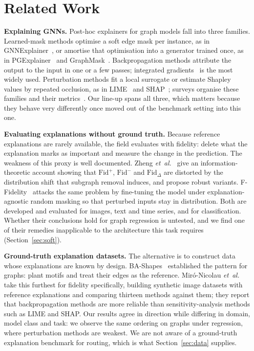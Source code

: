 \documentclass[conference]{IEEEtran}
\begin{document}
\section{Related Work}
\label{sec:related}
\textbf{Explaining GNNs.} Post-hoc explainers for graph models fall into three
families. Learned-mask methods optimise a soft edge mask per instance, as in
GNNExplainer~\cite{ying2019gnnexplainer}, or amortise that optimisation into a
generator trained once, as in PGExplainer~\cite{luo2020pgexplainer} and
GraphMask~\cite{schlichtkrull2021graphmask}. Backpropagation methods attribute
the output to the input in one or a few passes; integrated
gradients~\cite{sundararajan2017ig} is the most widely used. Perturbation
methods fit a local surrogate or estimate Shapley values by repeated
occlusion, as in LIME~\cite{ribeiro2016lime} and SHAP~\cite{lundberg2017shap}; surveys
organise these families and their metrics~\cite{li2022survey}. Our line-up
spans all three, which matters because
they behave very differently once moved out of the benchmark setting into
this one.

\textbf{Evaluating explanations without ground truth.} Because reference
explanations are rarely available, the field evaluates with fidelity: delete
what the explanation marks as important and measure the change in the
prediction. The weakness of this proxy is well documented. Zheng
\emph{et~al.}~\cite{zheng2024robustfidelity} give an information-theoretic
account showing that $\mathrm{Fid}^{+}$, $\mathrm{Fid}^{-}$ and
$\mathrm{Fid}_{\Delta}$ are distorted by the distribution shift that subgraph
removal induces, and propose robust variants. F-Fidelity~\cite{zheng2025ffidelity}
attacks the same problem by fine-tuning the model under explanation-agnostic
random masking so that perturbed inputs stay in distribution. Both are
developed and evaluated
for images, text and time series, and for classification. Whether their
conclusions hold for graph regression is untested, and we find one of their
remedies inapplicable to the architecture this task requires
(Section~\ref{sec:soft}).

\textbf{Ground-truth explanation datasets.} The alternative is to construct
data whose explanations are known by design. BA-Shapes~\cite{ying2019gnnexplainer}
established the pattern for graphs: plant motifs and treat their edges as the
reference. Mir\'o-Nicolau \emph{et~al.}~\cite{mironicolau2023fidelity} take this
furthest for fidelity specifically, building synthetic image datasets with
reference explanations and comparing thirteen methods against them; they report
that backpropagation methods are more reliable than sensitivity-analysis
methods such as LIME and SHAP. Our results agree in direction while differing in
domain, model class and task: we observe the same ordering on graphs under
regression, where perturbation methods are weakest. We are not aware of a
ground-truth explanation benchmark for routing, which is what
Section~\ref{sec:data} supplies.
\end{document}
